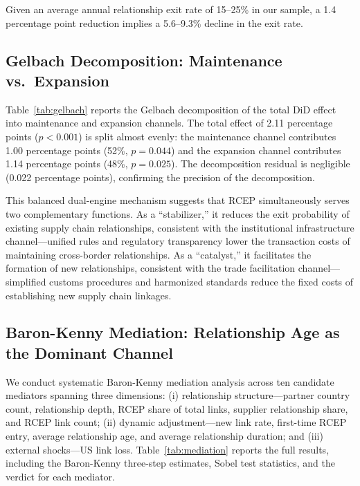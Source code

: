 \documentclass[preprint,12pt,authoryear]{elsarticle}
\begin{document}
Given an average annual relationship exit rate of 15--25\% in our sample, a 1.4 percentage point reduction implies a 5.6--9.3\% decline in the exit rate.

\subsection{Gelbach Decomposition: Maintenance vs.\ Expansion}



Table~\ref{tab:gelbach} reports the Gelbach decomposition of the total DiD effect into maintenance and expansion channels. The total effect of 2.11 percentage points ($p < 0.001$) is split almost evenly: the maintenance channel contributes 1.00 percentage points (52\%, $p = 0.044$) and the expansion channel contributes 1.14 percentage points (48\%, $p = 0.025$). The decomposition residual is negligible (0.022 percentage points), confirming the precision of the decomposition.

This balanced dual-engine mechanism suggests that RCEP simultaneously serves two complementary functions. As a ``stabilizer,'' it reduces the exit probability of existing supply chain relationships, consistent with the institutional infrastructure channel---unified rules and regulatory transparency lower the transaction costs of maintaining cross-border relationships. As a ``catalyst,'' it facilitates the formation of new relationships, consistent with the trade facilitation channel---simplified customs procedures and harmonized standards reduce the fixed costs of establishing new supply chain linkages.

\subsection{Baron-Kenny Mediation: Relationship Age as the Dominant Channel}



We conduct systematic Baron-Kenny mediation analysis across ten candidate mediators spanning three dimensions: (i) relationship structure---partner country count, relationship depth, RCEP share of total links, supplier relationship share, and RCEP link count; (ii) dynamic adjustment---new link rate, first-time RCEP entry, average relationship age, and average relationship duration; and (iii) external shocks---US link loss. Table~\ref{tab:mediation} reports the full results, including the Baron-Kenny three-step estimates, Sobel test statistics, and the verdict for each mediator.
\end{document}
